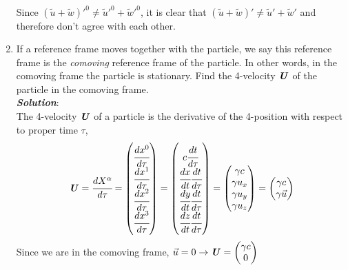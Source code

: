 \documentclass[10pt,a4paper]{article}
\theoremstyle{break}
\begin{document}
\begin{enumerate}
\begin{equation*}
\begin{split}
      \end{split}
    \end{equation*}
    Since $(\widetilde{u}+\widetilde{w})'^0 \neq \widetilde{u}'^0 + \widetilde{w}'^0$, it is clear that $(\widetilde{u}+\widetilde{w})' \neq \widetilde{u}' + \widetilde{w}'$ and therefore don't agree with each other.
    \item If a reference frame moves together with the particle, we say this reference frame is the \textit{comoving} reference frame of the particle. In other words, in the comoving frame the particle is stationary. Find the 4-velocity $\textbf{\textit{U}}$ of the particle in the comoving frame.
    \newline\\
    \textbf{\textit{Solution}}:
    \newline\\
    The 4-velocity $\textbf{\textit{U}}$ of a particle is the derivative of the 4-position with respect to proper time $\tau$,
    \[
    \textbf{\textit{U}} = \cfrac{dX^{\alpha}}{d\tau} =
      \begin{pmatrix}
        \cfrac{dx^0}{d\tau}\\
        \cfrac{dx^1}{d\tau}\\
        \cfrac{dx^2}{d\tau}\\
        \cfrac{dx^3}{d\tau}
      \end{pmatrix} =
      \begin{pmatrix}
        c\cfrac{dt}{d\tau}\\
        \cfrac{dx}{dt}\cfrac{dt}{d\tau}\\
        \cfrac{dy}{dt}\cfrac{dt}{d\tau}\\
        \cfrac{dz}{dt}\cfrac{dt}{d\tau}
      \end{pmatrix}=
      \begin{pmatrix}
        \gamma c\\
        \gamma u_x\\
        \gamma u_y\\
        \gamma u_z
      \end{pmatrix}=
      \begin{pmatrix}
        \gamma c \\
        \gamma \Vec{u}
      \end{pmatrix}
    \]
    Since we are in the comoving frame, $\Vec{u} = 0 \to \textbf{\textit{U}} = \begin{pmatrix} \gamma c \\ 0 \end{pmatrix}$


\end{enumerate}
\end{document}
